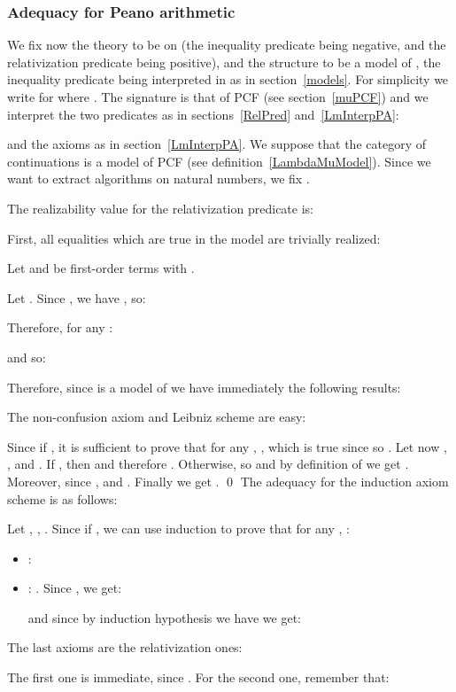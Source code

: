 \documentclass{CSML}
\begin{document}
\subsubsection{Adequacy for Peano arithmetic}
\label{OrthoRealPeano}
We fix now the theory to be  on  (the inequality predicate being negative, and the relativization predicate being positive), and the structure  to be a model of , the inequality predicate being interpreted in  as in section~\ref{models}. For simplicity we write  for  where . The  signature is that of PCF (see section~\ref{muPCF}) and we interpret the two predicates as in sections~\ref{RelPred} and~\ref{LmInterpPA}:

and the axioms as in section~\ref{LmInterpPA}. We suppose that the category of continuations  is a model of PCF (see definition~\ref{LambdaMuModel}). Since we want to extract algorithms on natural numbers, we fix .\par
The realizability value for the relativization predicate is:

First, all equalities which are true in the model are trivially realized:
\begin{lem}
Let  and  be first-order terms with .

\end{lem}
\proof
Let . Since , we have , so:

Therefore, for any :

and so:

Therefore, since  is a model of  we have immediately the following results:

The non-confusion axiom and Leibniz scheme are easy:
\begin{lem}

\end{lem}
\proof
Since  if , it is sufficient to prove that for any , , which is true since  so . Let now , ,  and . If , then  and therefore . Otherwise,  so  and by definition of  we get . Moreover, since ,  and . Finally we get .
\qed
The adequacy for the induction axiom scheme is as follows:
\begin{lem}

\end{lem}
\proof
Let , , . Since  if , we can use induction to prove that for any , :
\begin{itemize}
\item: 
\item: . Since , we get:

and since by induction hypothesis we have  we get:

\end{itemize}
The last axioms are the relativization ones:
\begin{lem}

\end{lem}
\proof
The first one is immediate, since . For the second one, remember that:
\end{document}
